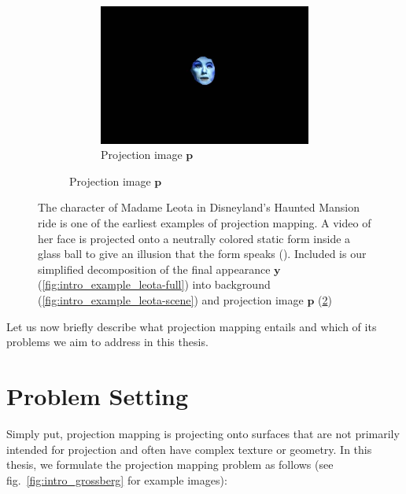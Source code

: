 \begin{figure}
\begin{subfigure}{0.39\textwidth}
        \begin{subfigure}{\textwidth}
            \centering
            \includegraphics[width=\textwidth]{images/01-Leota-only_head.jpg}
            \caption{Projection image \(\bm{p}\)}
            \label{fig:intro_example_leota-head}
        \end{subfigure}
    \end{subfigure}
    \caption{The character of Madame Leota in Disneyland's Haunted Mansion ride is one of the earliest examples of projection mapping. A video of her face is projected onto a neutrally colored static form inside a glass ball to give an illusion that the form speaks (\citet{MadameLeota}). Included is our simplified decomposition of the final appearance \(\bm{y}\) (\ref{fig:intro_example_leota-full}) into background (\ref{fig:intro_example_leota-scene}) and projection image \(\bm{p}\) (\ref{fig:intro_example_leota-head})}
    \label{fig:intro_example_leota}
\end{figure}

Let us now briefly describe what projection mapping entails and which of its problems we aim to address in this thesis.

\section{Problem Setting}
\label{section:intro-problem_setting}

Simply put, projection mapping is projecting onto surfaces that are not primarily intended for projection and often have complex texture or geometry. In this thesis, we formulate the projection mapping problem as follows (see fig.~\ref{fig:intro_grossberg} for example images):

